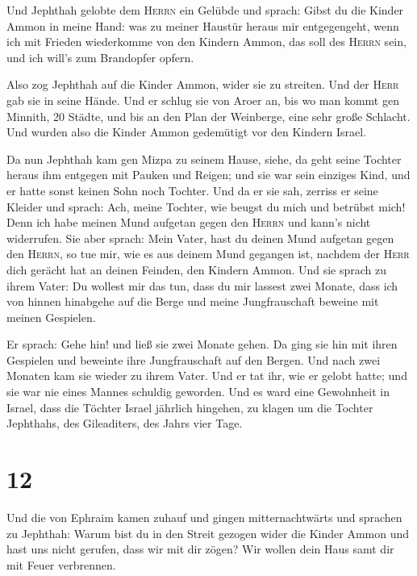  Und Jephthah gelobte dem \textsc{Herrn} ein Gelübde und
sprach: Gibst du die Kinder Ammon in meine Hand:  was zu
meiner Haustür heraus mir entgegengeht, wenn ich mit Frieden wiederkomme
von den Kindern Ammon, das soll des \textsc{Herrn} sein, und ich will's
zum Brandopfer opfern.

 Also zog Jephthah auf die Kinder Ammon, wider sie zu
streiten. Und der \textsc{Herr} gab sie in seine Hände. 
Und er schlug sie von Aroer an, bis wo man kommt gen Minnith, 20 Städte,
und bis an den Plan der Weinberge, eine sehr große Schlacht. Und wurden
also die Kinder Ammon gedemütigt vor den Kindern Israel.

 Da nun Jephthah kam gen Mizpa zu seinem Hause, siehe, da
geht seine Tochter heraus ihm entgegen mit Pauken und Reigen; und sie
war sein einziges Kind, und er hatte sonst keinen Sohn noch Tochter.
 Und da er sie sah, zerriss er seine Kleider und sprach:
Ach, meine Tochter, wie beugst du mich und betrübst mich! Denn ich habe
meinen Mund aufgetan gegen den \textsc{Herrn} und kann's nicht
widerrufen.  Sie aber sprach: Mein Vater, hast du deinen
Mund aufgetan gegen den \textsc{Herrn}, so tue mir, wie es aus deinem
Mund gegangen ist, nachdem der \textsc{Herr} dich gerächt hat an deinen
Feinden, den Kindern Ammon.  Und sie sprach zu ihrem
Vater: Du wollest mir das tun, dass du mir lassest zwei Monate, dass ich
von hinnen hinabgehe auf die Berge und meine Jungfrauschaft beweine mit
meinen Gespielen.

 Er sprach: Gehe hin! und ließ sie zwei Monate gehen. Da
ging sie hin mit ihren Gespielen und beweinte ihre Jungfrauschaft auf
den Bergen.  Und nach zwei Monaten kam sie wieder zu
ihrem Vater. Und er tat ihr, wie er gelobt hatte; und sie war nie eines
Mannes schuldig geworden. Und es ward eine Gewohnheit in Israel,
 dass die Töchter Israel jährlich hingehen, zu klagen um
die Tochter Jephthahs, des Gileaditers, des Jahrs vier Tage.

\hypertarget{section-11}{%
\section{12}\label{section-11}}

 Und die von Ephraim kamen zuhauf und gingen
mitternachtwärts und sprachen zu Jephthah: Warum bist du in den Streit
gezogen wider die Kinder Ammon und hast uns nicht gerufen, dass wir mit
dir zögen? Wir wollen dein Haus samt dir mit Feuer verbrennen.

